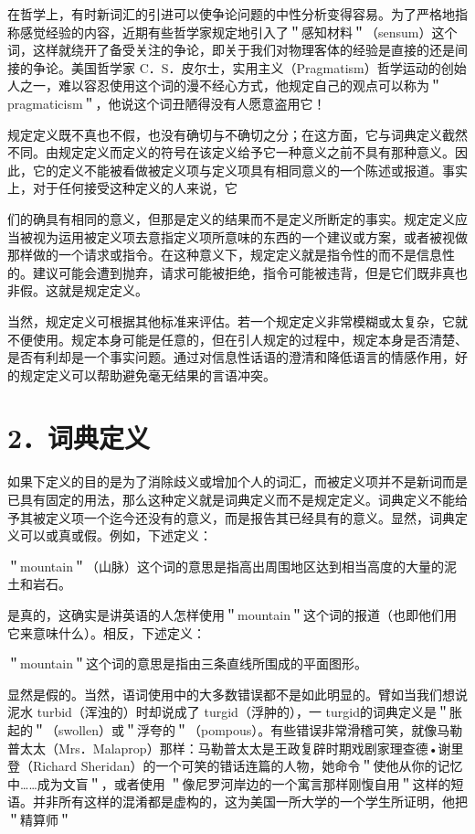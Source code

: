 在哲学上，有时新词汇的引进可以使争论问题的中性分析变得容易。为了严格地指称感觉经验的内容，近期有些哲学家规定地引入了＂感知材料＂（sensum）这个词，这样就绕开了备受关注的争论，即关于我们对物理客体的经验是直接的还是间接的争论。美国哲学家 C．S．皮尔士，实用主义（Pragmatism）哲学运动的创始人之一，难以容忍使用这个词的漫不经心方式，他规定自己的观点可以称为＂pragmaticism＂，他说这个词丑陋得没有人愿意盗用它！

规定定义既不真也不假，也没有确切与不确切之分；在这方面，它与词典定义截然不同。由规定定义而定义的符号在该定义给予它一种意义之前不具有那种意义。因此，它的定义不能被看做被定义项与定义项具有相同意义的一个陈述或报道。事实上，对于任何接受这种定义的人来说，它

们的确具有相同的意义，但那是定义的结果而不是定义所断定的事实。规定定义应当被视为运用被定义项去意指定义项所意味的东西的一个建议或方案，或者被视做那样做的一个请求或指令。在这种意义下，规定定义就是指令性的而不是信息性的。建议可能会遭到抛弃，请求可能被拒绝，指令可能被违背，但是它们既非真也非假。这就是规定定义。

当然，规定定义可根据其他标准来评估。若一个规定定义非常模糊或太复杂，它就不便使用。规定本身可能是任意的，但在引人规定的过程中，规定本身是否清楚、是否有利却是一个事实问题。通过对信息性话语的澄清和降低语言的情感作用，好的规定定义可以帮助避免毫无结果的言语冲突。

\section*{2．词典定义}
如果下定义的目的是为了消除歧义或增加个人的词汇，而被定义项并不是新词而是已具有固定的用法，那么这种定义就是词典定义而不是规定定义。词典定义不能给予其被定义项一个迄今还没有的意义，而是报告其已经具有的意义。显然，词典定义可以或真或假。例如，下述定义：

\begin{displayquote}
＂mountain＂（山脉）这个词的意思是指高出周围地区达到相当高度的大量的泥土和岩石。
\end{displayquote}

是真的，这确实是讲英语的人怎样使用＂mountain＂这个词的报道（也即他们用它来意味什么）。相反，下述定义：

\begin{displayquote}
＂mountain＂这个词的意思是指由三条直线所围成的平面图形。
\end{displayquote}

显然是假的。当然，语词使用中的大多数错误都不是如此明显的。臂如当我们想说泥水 turbid（浑浊的）时却说成了 turgid（浮肿的），一 turgid的词典定义是＂胀起的＂（swollen）或＂浮夸的＂（pompous）。有些错误非常滑稽可笑，就像马勒普太太（Mrs．Malaprop）那样：马勒普太太是王政复辟时期戏剧家理查德•谢里登（Richard Sheridan）的一个可笑的错话连篇的人物，她命令＂使他从你的记忆中……成为文盲＂，或者使用 ＂像尼罗河岸边的一个寓言那样刚愎自用＂这样的短语。并非所有这样的混淆都是虚构的，这为美国一所大学的一个学生所证明，他把＂精算师＂

